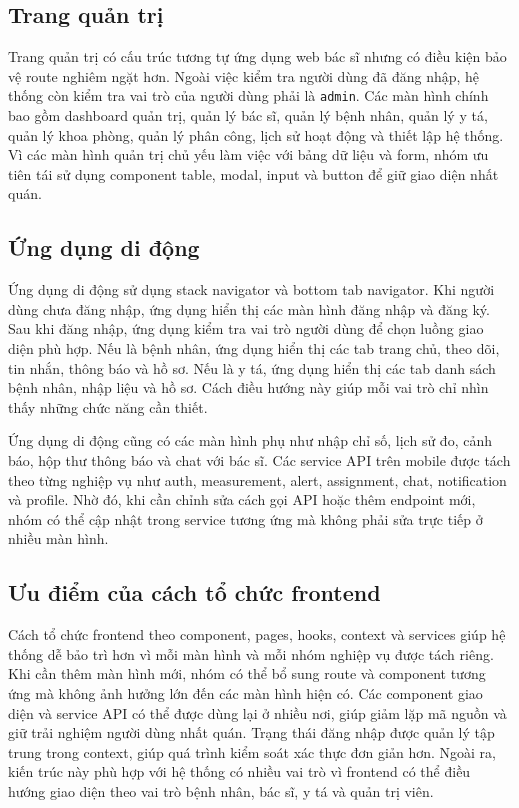\subsection{Trang quản trị}
\par Trang quản trị có cấu trúc tương tự ứng dụng web bác sĩ nhưng có điều kiện bảo vệ route nghiêm ngặt hơn. Ngoài việc kiểm tra người dùng đã đăng nhập, hệ thống còn kiểm tra vai trò của người dùng phải là \texttt{admin}. Các màn hình chính bao gồm dashboard quản trị, quản lý bác sĩ, quản lý bệnh nhân, quản lý y tá, quản lý khoa phòng, quản lý phân công, lịch sử hoạt động và thiết lập hệ thống. Vì các màn hình quản trị chủ yếu làm việc với bảng dữ liệu và form, nhóm ưu tiên tái sử dụng component table, modal, input và button để giữ giao diện nhất quán.

\subsection{Ứng dụng di động}
\par Ứng dụng di động sử dụng stack navigator và bottom tab navigator. Khi người dùng chưa đăng nhập, ứng dụng hiển thị các màn hình đăng nhập và đăng ký. Sau khi đăng nhập, ứng dụng kiểm tra vai trò người dùng để chọn luồng giao diện phù hợp. Nếu là bệnh nhân, ứng dụng hiển thị các tab trang chủ, theo dõi, tin nhắn, thông báo và hồ sơ. Nếu là y tá, ứng dụng hiển thị các tab danh sách bệnh nhân, nhập liệu và hồ sơ. Cách điều hướng này giúp mỗi vai trò chỉ nhìn thấy những chức năng cần thiết.

\par Ứng dụng di động cũng có các màn hình phụ như nhập chỉ số, lịch sử đo, cảnh báo, hộp thư thông báo và chat với bác sĩ. Các service API trên mobile được tách theo từng nghiệp vụ như auth, measurement, alert, assignment, chat, notification và profile. Nhờ đó, khi cần chỉnh sửa cách gọi API hoặc thêm endpoint mới, nhóm có thể cập nhật trong service tương ứng mà không phải sửa trực tiếp ở nhiều màn hình.

\subsection{Ưu điểm của cách tổ chức frontend}
\par Cách tổ chức frontend theo component, pages, hooks, context và services giúp hệ thống dễ bảo trì hơn vì mỗi màn hình và mỗi nhóm nghiệp vụ được tách riêng. Khi cần thêm màn hình mới, nhóm có thể bổ sung route và component tương ứng mà không ảnh hưởng lớn đến các màn hình hiện có. Các component giao diện và service API có thể được dùng lại ở nhiều nơi, giúp giảm lặp mã nguồn và giữ trải nghiệm người dùng nhất quán. Trạng thái đăng nhập được quản lý tập trung trong context, giúp quá trình kiểm soát xác thực đơn giản hơn. Ngoài ra, kiến trúc này phù hợp với hệ thống có nhiều vai trò vì frontend có thể điều hướng giao diện theo vai trò bệnh nhân, bác sĩ, y tá và quản trị viên.

